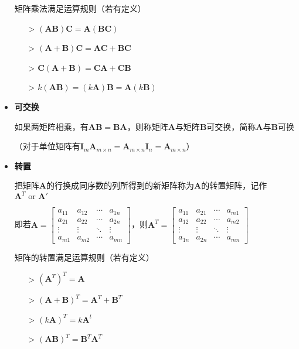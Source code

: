 \documentclass[UTF8]{ctexart}
\newcommand{\ve}[1]{{\bm{#1}}}
\newcommand{\mat}[1]{\ve{#1}}
\newcommand{\emplin}{\vspace{1em}}
\begin{document}
\begin{itemize}
  矩阵乘法满足运算规则（若有定义）
  \begin{itemize}
    \item[>] $\displaystyle (\mat{A}\mat{B})\mat{C}=\mat{A}(\mat{B}\mat{C})$
    \item[>] $\displaystyle (\mat{A}+\mat{B})\mat{C}=\mat{A}\mat{C}+\mat{B}\mat{C}$
    \item[>] $\displaystyle \mat{C}(\mat{A}+\mat{B})=\mat{C}\mat{A}+\mat{C}\mat{B}$
    \item[>] $\displaystyle k(\mat{A}\mat{B})=(k\mat{A})\mat{B}=\mat{A}(k\mat{B})$
  \end{itemize}

  \item \textbf{可交换}

  如果两矩阵相乘，有$\mat{A}\mat{B}=\mat{B}\mat{A}$，则称矩阵$\mat{A}$与矩阵$\mat{B}$可交换，简称$\mat{A}$与$\mat{B}$可换

  （对于单位矩阵有$\mat{I}_m\mat{A}_{m\times n}=\mat{A}_{m\times n}\mat{I}_n=\mat{A}_{m\times n}$）

  \item \textbf{转置}

  把矩阵$\mat{A}$的行换成同序数的列所得到的新矩阵称为$\mat{A}$的转置矩阵，记作$\mat{A}^T\text{ or }\mat{A}'$

  即若$\displaystyle\mat{A}=\begin{bmatrix}
  a_{11}&a_{12}&\cdots&a_{1n}\\
  a_{21}&a_{22}&\cdots&a_{2n}\\
  \vdots&\vdots&\ddots&\vdots\\
  a_{m1}&a_{m2}&\cdots&a_{mn}
  \end{bmatrix}$，则$\displaystyle\mat{A}^T=\begin{bmatrix}
  a_{11}&a_{21}&\cdots&a_{m1}\\
  a_{12}&a_{22}&\cdots&a_{m2}\\
  \vdots&\vdots&\ddots&\vdots\\
  a_{1n}&a_{2n}&\cdots&a_{mn}
  \end{bmatrix}$

  \emplin

  矩阵的转置满足运算规则（若有定义）
  \begin{itemize}
    \item[>] $\displaystyle (\mat{A}^T)^T=\mat{A}$
    \item[>] $\displaystyle (\mat{A}+\mat{B})^T=\mat{A}^T+\mat{B}^T$
    \item[>] $\displaystyle (k\mat{A})^T=k\mat{A}^t$
    \item[>] $\displaystyle (\mat{A}\mat{B})^T=\mat{B}^T\mat{A}^T$
  \end{itemize}


\end{itemize}
\end{document}

